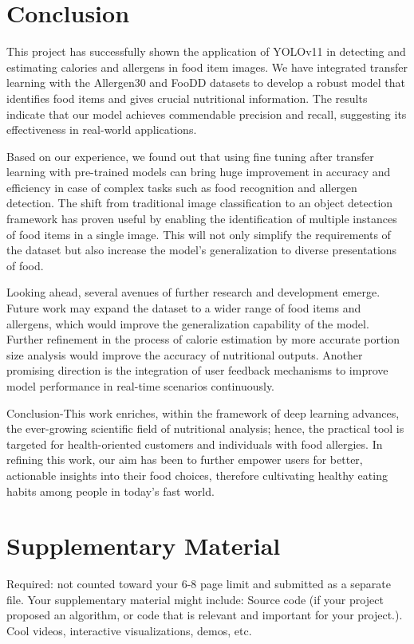 \documentclass[10pt,twocolumn,letterpaper]{article}
\begin{document}
\section{Conclusion}
This project has successfully shown the application of YOLOv11 in detecting and estimating calories and allergens in food item images. 
We have integrated transfer learning with the Allergen30 and FooDD datasets to develop a robust model that identifies food items and gives crucial nutritional information. 
The results indicate that our model achieves commendable precision and recall, suggesting its effectiveness in real-world applications.

Based on our experience, we found out that using fine tuning after transfer learning with pre-trained models can bring huge improvement in accuracy and efficiency in case of complex tasks such as food recognition and allergen detection. 
The shift from traditional image classification to an object detection framework has proven useful by enabling the identification of multiple instances of food items in a single image. 
This will not only simplify the requirements of the dataset but also increase the model's generalization to diverse presentations of food.

Looking ahead, several avenues of further research and development emerge. 
Future work may expand the dataset to a wider range of food items and allergens, which would improve the generalization capability of the model. 
Further refinement in the process of calorie estimation by more accurate portion size analysis would improve the accuracy of nutritional outputs. 
Another promising direction is the integration of user feedback mechanisms to improve model performance in real-time scenarios continuously.

Conclusion-This work enriches, within the framework of deep learning advances, the ever-growing scientific field of nutritional analysis; hence, the practical tool is targeted for health-oriented customers and individuals with food allergies. 
In refining this work, our aim has been to further empower users for better, actionable insights into their food choices, therefore cultivating healthy eating habits among people in today's fast world.

\section{Supplementary Material}
Required: not counted toward your 6-8 page limit and submitted as a separate file. Your supplementary material might include:
Source code (if your project proposed an algorithm, or code that is relevant and important for your project.).
Cool videos, interactive visualizations, demos, etc.

{
    \small
    
    
}
\end{document}

